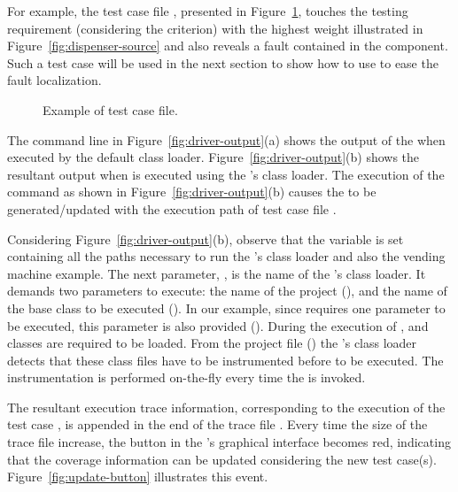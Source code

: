 For example, the test case file , presented in
Figure~\ref{fig:input1}, touches the testing requirement
(considering the  criterion) with the highest
weight illustrated in Figure~\ref{fig:dispenser-source} and also
reveals a fault contained in the  component. Such a
test case will be used in the next section to show how to use
\toolname to ease the fault localization.

\begin{figure}[!ht]
\vspace{-0.7cm} \caption{Example of test case
file.}\label{fig:input1}
\end{figure}

The command line in Figure~\ref{fig:driver-output}(a) shows the
output of the  when executed by the default
class loader. Figure~\ref{fig:driver-output}(b) shows the
resultant output when  is executed using
the \toolname's class loader. The execution of the command as
shown in Figure~\ref{fig:driver-output}(b) causes the
 to be generated/updated with the execution
path of test case file .



Considering Figure~\ref{fig:driver-output}(b), observe that the
 variable is set containing all the paths necessary
to run the \toolname's class loader and also the vending machine
example. The next parameter, , is the name
of the \toolname's class loader. It demands two parameters to
execute: the name of the project (), and the
name of the base class to be executed ().
In our example, since  requires one
parameter to be executed, this parameter is also provided
(). During the execution of ,
 and  classes are required to be
loaded. From the project file () the \toolname's
class loader detects that these class files have to be
instrumented before to be executed. The instrumentation is
performed on-the-fly every time the  is
invoked.

The resultant execution trace information, corresponding to the
execution of the test case , is appended in the end of
the trace file . Every time the size of the
trace file increase, the  button in the \toolname's
graphical interface becomes red, indicating that the coverage
information can be updated considering the new test case(s).
Figure~\ref{fig:update-button} illustrates this event.

